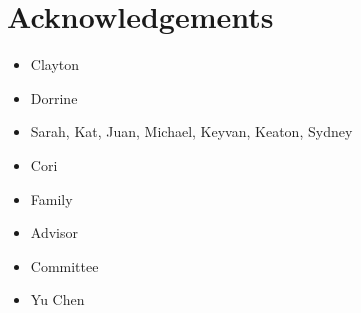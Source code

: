 \chapter{Acknowledgements}
\doublespacing


\begin{itemize}
    \item Clayton
    \item Dorrine
    \item Sarah, Kat, Juan, Michael, Keyvan, Keaton, Sydney
    \item Cori
    \item Family
\end{itemize}





\begin{itemize}
    \item Advisor
    \item Committee
    \item Yu Chen
\end{itemize}


